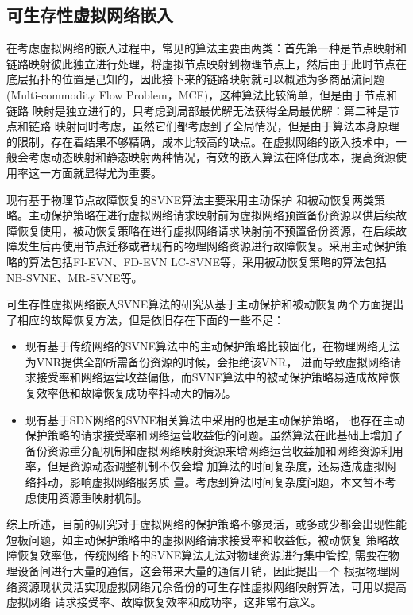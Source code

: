 \subsection{可生存性虚拟网络嵌入}
在考虑虚拟网络的嵌入过程中，常见的算法主要由两类：首先第一种是节点映射和链路映射彼此独立进行处理，将虚拟节点映射到物理节点上，然后由于此时节点在底层拓扑的位置是己知的，因此接下来的链路映射就可以概述为多商品流问题 (Multi-commodity Flow Problem，MCF)，这种算法比较简单，但是由于节点和链路 映射是独立进行的，只考虑到局部最优解无法获得全局最优解：第二种是节点和链路 映射同时考虑，虽然它们都考虑到了全局情况，但是由于算法本身原理的限制，存在着结果不够精确，成本比较高的缺点。在虚拟网络的嵌入技术中，一般会考虑动态映射和静态映射两种情况，有效的嵌入算法在降低成本，提高资源使用率这一方面就显得尤为重要。



现有基于物理节点故障恢复的SVNE算法主要采用主动保护\cite{yu2011cost,wang2014survivable,sun2010efficient,hu2012location} 和被动恢复\cite{rahman2010survivable,qiang2014heuristic,bo2014dynamic}两类策略。主动保护策略在进行虚拟网络请求映射前为虚拟网络预置备份资源以供后续故障恢复使用，被动恢复策略在进行虚拟网络请求映射前不预置备份资源，在后续故障发生后再使用节点迁移或者现有的物理网络资源进行故障恢复。采用主动保护策略的算法包括FI-EVN\cite{yu2011cost}、FD-EVN\cite{wang2014survivable} LC-SVNE\cite{hu2012location}等，采用被动恢复策略的算法包括NB-SVNE\cite{bo2014dynamic}、MR-SVNE\cite{qiang2014heuristic}等。

可生存性虚拟网络嵌入SVNE算法的研究从基于主动保护和被动恢复两个方面提出了相应的故障恢复方法，但是依旧存在下面的一些不足：
\begin{itemize}
  \item 现有基于传统网络的SVNE算法中的主动保护策略比较固化，在物理网络无法为VNR提供全部所需备份资源的时候，会拒绝该VNR， 进而导致虚拟网络请求接受率和网络运营收益偏低，而SVNE算法中的被动保护策略易造成故障恢复效率低和故障恢复成功率抖动大的情况。
  \item 现有基于SDN网络的SVNE相关算法中采用的也是主动保护策略， 也存在主动保护策略的请求接受率和网络运营收益低的问题。虽然算法在此基础上增加了备份资源重分配机制和虚拟网络映射资源来增网络运营收益加和网络资源利用率，但是资源动态调整机制不仅会增 加算法的时间复杂度，还易造成虚拟网络抖动，影响虚拟网络服务质 量。考虑到算法时间复杂度问题，本文暂不考虑使用资源重映射机制。
\end{itemize}

综上所述，目前的研究对于虚拟网络的保护策略不够灵活，或多或少都会出现性能短板问题，如主动保护策略中的虚拟网络请求接受率和收益低，被动恢复 策略故障恢复效率低，传统网络下的SVNE算法无法对物理资源进行集中管控, 需要在物理设备间进行大量的通信，这会带来大量的通信开销，因此提出一个 根据物理网络资源现状灵活实现虚拟网络冗佘备份的可生存性虚拟网络映射算法，可用以提高虚拟网络 请求接受率、故障恢复效率和成功率，这非常有意义。

